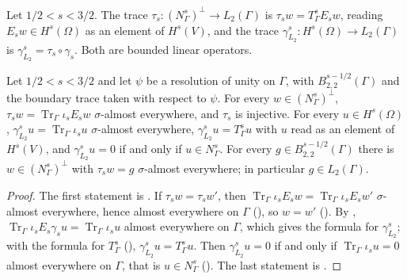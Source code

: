 \begin{definition}
\label{def:trace-l2}
\leanok
{}
Let $1/2 < s < 3/2$. The trace $\tau_s : (N^s_\Gamma)^\perp \to L_2(\Gamma)$ is
$\tau_s w = T^s_\Gamma E_s w$, reading $E_s w \in H^s(\Omega)$ as an element of $H^s(V)$, and
the trace $\gamma^s_{L_2} : H^s(\Omega) \to L_2(\Gamma)$ is
$\gamma^s_{L_2} = \tau_s \circ \gamma_s$. Both are bounded linear operators.
\end{definition}

\begin{theorem}
\label{thm:trace-l2}
\leanok
{}
Let $1/2 < s < 3/2$ and let $\psi$ be a resolution of unity on $\Gamma$, with
$B^{s-1/2}_{2,2}(\Gamma)$ and the boundary trace taken with respect to $\psi$. For every
$w \in (N^s_\Gamma)^\perp$, $\tau_s w = \operatorname{Tr}_\Gamma \iota_s E_s w$ $\sigma$-almost
everywhere, and $\tau_s$ is injective. For every $u \in H^s(\Omega)$,
$\gamma^s_{L_2} u = \operatorname{Tr}_\Gamma \iota_s u$ $\sigma$-almost everywhere,
$\gamma^s_{L_2} u = T^s_\Gamma u$ with $u$ read as an element of $H^s(V)$, and
$\gamma^s_{L_2} u = 0$ if and only if $u \in N^s_\Gamma$. For every
$g \in B^{s-1/2}_{2,2}(\Gamma)$ there is $w \in (N^s_\Gamma)^\perp$ with $\tau_s w = g$
$\sigma$-almost everywhere; in particular $g \in L_2(\Gamma)$.
\end{theorem}

\begin{proof}
\leanok
The first statement is . If $\tau_s w = \tau_s w'$, then
$\operatorname{Tr}_\Gamma \iota_s E_s w = \operatorname{Tr}_\Gamma \iota_s E_s w'$
$\sigma$-almost everywhere, hence almost everywhere on $\Gamma$
(), so $w = w'$ (). By
, $\operatorname{Tr}_\Gamma \iota_s E_s \gamma_s u =
\operatorname{Tr}_\Gamma \iota_s u$ almost everywhere on $\Gamma$, which gives the formula for
$\gamma^s_{L_2}$; with the formula for $T^s_\Gamma$ (),
$\gamma^s_{L_2} u = T^s_\Gamma u$. Then $\gamma^s_{L_2} u = 0$ if and only if
$\operatorname{Tr}_\Gamma \iota_s u = 0$ almost everywhere on $\Gamma$, that is
$u \in N^s_\Gamma$ (). The last statement is
.
\end{proof}

